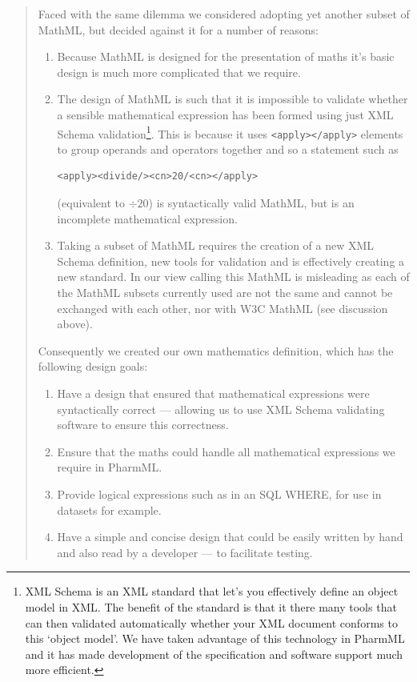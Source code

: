 \documentclass[a4paper,11pt]{article}
\newcommand{\mathml}{MathML\xspace}
\newcommand{\pharmml}{PharmML\xspace}
\begin{document}
\begin{quotation}
Faced with the same dilemma we considered adopting yet another subset
of \mathml, but decided against it for a number of reasons:
\begin{enumerate}
\item Because \mathml is designed for the presentation of maths it's
  basic design is much more complicated that we require.
\item The design of \mathml is such that it is impossible to validate
  whether a sensible mathematical expression has been formed using
  just XML Schema validation\footnote{XML Schema is an XML standard
    that let's you effectively define an object model in XML. The
    benefit of the standard is that it there many tools that can then
    validated automatically whether your XML document conforms to this
    `object model'. We have taken advantage of this technology in
    \pharmml and it has made development of the specification and
    software support much more efficient.}. This is because it uses
  \verb|<apply></apply>| elements to group operands and operators
  together and so a statement such as
  \begin{verbatim}
<apply><divide/><cn>20/<cn></apply>
\end{verbatim}
 (equivalent to $\div 20$) is syntactically valid \mathml, but is an incomplete mathematical
  expression.
\item Taking a subset of \mathml requires the creation of a new XML
  Schema definition, new tools for validation and is effectively
  creating a new standard. In our view calling this \mathml is
  misleading as each of the \mathml subsets currently used are not the
  same and cannot be exchanged with each other, nor with W3C \mathml
  (see discussion above).
\end{enumerate}
Consequently we created our own mathematics definition, which has the
following design goals:
\begin{enumerate}
\item Have a design that ensured that mathematical expressions
  were syntactically correct --- allowing us to use XML Schema
  validating software to ensure this correctness.
\item Ensure that the maths could handle all mathematical expressions
  we require in \pharmml.
\item Provide logical expressions such as in an SQL WHERE, for use in
  datasets for example.
\item Have a simple and concise design that could be easily written by hand
  and also read by a developer --- to facilitate testing.
\end{enumerate}
\end{quotation}
\end{document}
